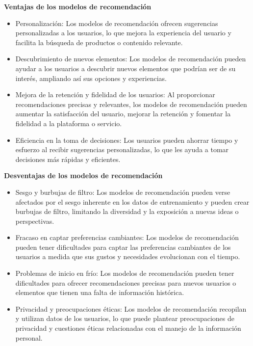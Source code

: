 \textbf{Ventajas de los modelos de recomendación}

\begin{itemize}
    \item Personalización: Los modelos de recomendación ofrecen sugerencias personalizadas a los usuarios, lo que mejora la experiencia del usuario y facilita la búsqueda de productos o contenido relevante.
    \item Descubrimiento de nuevos elementos: Los modelos de recomendación pueden ayudar a los usuarios a descubrir nuevos elementos que podrían ser de su interés, ampliando así sus opciones y experiencias.
    \item Mejora de la retención y fidelidad de los usuarios: Al proporcionar recomendaciones precisas y relevantes, los modelos de recomendación pueden aumentar la satisfacción del usuario, mejorar la retención y fomentar la fidelidad a la plataforma o servicio.
    \item Eficiencia en la toma de decisiones: Los usuarios pueden ahorrar tiempo y esfuerzo al recibir sugerencias personalizadas, lo que les ayuda a tomar decisiones más rápidas y eficientes.
\end{itemize}

\textbf{Desventajas de los modelos de recomendación}

\begin{itemize}
    \item Sesgo y burbujas de filtro: Los modelos de recomendación pueden verse afectados por el sesgo inherente en los datos de entrenamiento y pueden crear burbujas de filtro, limitando la diversidad y la exposición a nuevas ideas o perspectivas.
    \item Fracaso en captar preferencias cambiantes: Los modelos de recomendación pueden tener dificultades para captar las preferencias cambiantes de los usuarios a medida que sus gustos y necesidades evolucionan con el tiempo.
    \item Problemas de inicio en frío: Los modelos de recomendación pueden tener dificultades para ofrecer recomendaciones precisas para nuevos usuarios o elementos que tienen una falta de información histórica.
    \item Privacidad y preocupaciones éticas: Los modelos de recomendación recopilan y utilizan datos de los usuarios, lo que puede plantear preocupaciones de privacidad y cuestiones éticas relacionadas con el manejo de la información personal.
\end{itemize}